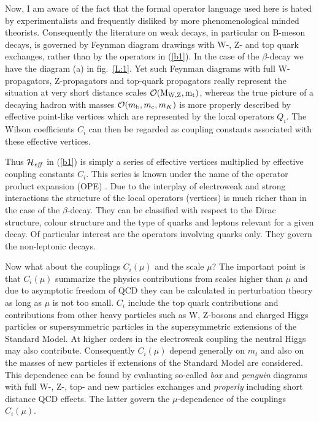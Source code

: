 \documentclass[12pt]{article}
\newcommand{\mc}{m_{\rm c}}
\newcommand{\mb}{m_{\rm b}}
\newcommand{\ord}{{\cal O}}
\begin{document}
Now, I am aware of the fact that the formal operator language used here is
hated by experimentalists and frequently disliked by more phenomenological
minded theorists. Consequently the literature on weak decays, in particular
on B-meson decays, is governed by Feynman diagram drawings with W-, Z- and top
quark exchanges, rather than by the operators in (\ref{b1}). 
In the case of the $\beta$-decay we have the diagram (a) in fig.~\ref{L:1}.
Yet such Feynman
diagrams with full W-propagators, Z-propagators and top-quark propagators
really represent the situation at very short distance scales 
$\ord ({\rm M_{W,Z}, m_t})$, whereas the
true picture of a decaying hadron with masses 
$\ord(\mb,\mc,m_K)$ is more properly described by
effective point-like vertices which are represented by the local operators
$Q_i$. The Wilson coefficients $C_i$ can then be regarded as coupling constants
associated with these effective vertices.

Thus ${\cal H}_{\it eff}$ in (\ref{b1}) is simply a series of effective 
vertices multiplied 
by effective coupling constants $C_i$. This series is known under the name 
of the operator product expansion (OPE) \cite{OPE,ZIMM,WIT}. 
Due to the interplay of electroweak 
and strong interactions the structure of the local operators (vertices) is 
much richer than in the case of the $\beta$-decay. They can be classified 
with respect to the Dirac structure, colour structure and the type of quarks 
and leptons relevant for a given decay. Of particular interest are the 
operators involving quarks only. They govern the non-leptonic decays.

Now what about the couplings $C_i(\mu)$ and the scale $\mu$? The 
important point is that $C_i(\mu)$
summarize the physics contributions from scales higher than $\mu$ and due to
asymptotic freedom of QCD they can be calculated in perturbation theory as
long as $\mu$ is not too small. $C_i$ include the top quark contributions and
contributions from other heavy particles such as W, Z-bosons and charged
Higgs particles or supersymmetric particles in the supersymmetric extensions
of the Standard Model. At higher orders in the electroweak coupling the
neutral Higgs may also contribute. Consequently $C_i(\mu)$ depend generally 
on $m_t$ and also on the masses of new particles if extensions of the 
Standard Model are considered. This dependence can be found by evaluating 
so-called {\it box} and {\it penguin} diagrams with full W-, Z-, top- and 
new particles exchanges and {\it properly} including short distance QCD 
effects. The latter govern the $\mu$-dependence of the couplings $C_i(\mu)$.
\end{document}
